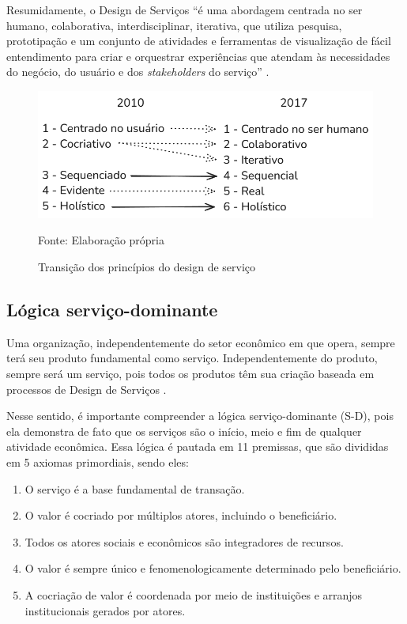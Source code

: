 Resumidamente, o Design de Serviços ``é uma abordagem centrada no ser humano, colaborativa, interdisciplinar, iterativa, que utiliza pesquisa, prototipação e um conjunto de atividades e ferramentas de visualização de fácil entendimento para criar e orquestrar experiências que atendam às necessidades do negócio, do usuário e dos \textit{stakeholders} do serviço'' \cite{Stickdorn2019}.

\begin{figure}[h]
	\centering %
	\includegraphics[width=16cm]{figuras/principios.png} %
	\caption{Transição dos princípios do design de serviço}
	Fonte: Elaboração própria
	\label{figura:qualquernome}
\end{figure}

\subsection{Lógica serviço-dominante}

Uma organização, independentemente do setor econômico em que opera, sempre terá seu produto fundamental como serviço. Independentemente do produto, sempre será um serviço, pois todos os produtos têm sua criação baseada em processos de Design de Serviços \cite{Stickdorn2019}.

Nesse sentido, é importante compreender a lógica serviço-dominante (S-D), pois ela demonstra de fato que os serviços são o início, meio e fim de qualquer atividade econômica. Essa lógica é pautada em 11 premissas, que são divididas em 5 axiomas primordiais, sendo eles:

\begin{enumerate}
	\item O serviço é a base fundamental de transação.
	\item O valor é cocriado por múltiplos atores, incluindo o beneficiário.
	\item Todos os atores sociais e econômicos são integradores de recursos.
	\item O valor é sempre único e fenomenologicamente determinado pelo beneficiário.
	\item A cocriação de valor é coordenada por meio de instituições e arranjos institucionais gerados por atores.
\end{enumerate}

